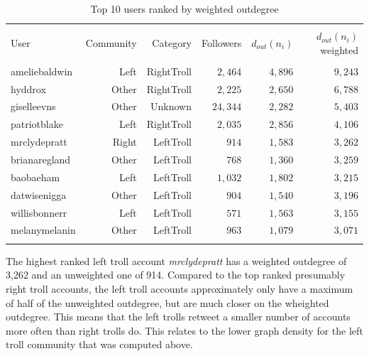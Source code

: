 \documentclass[12pt, titlepage=true, toc=bib]{scrartcl}
\begin{document}
\begin{table}[ht] \centering 
\begin{tabular*}{.95\linewidth}{@{\extracolsep{\fill}} lrrrrr} 
\\[-1.8ex]\hline 
\hline \\[-1.8ex] 
User & Community & Category & Followers & \( d_{out}(n_{i}) \) & \( d_{out}(n_{i}) \) weighted \\ 
\hline \\[-1.8ex] 
ameliebaldwin & Left & RightTroll & $2,464$ & $4,896$ & $9,243$ \\ 
hyddrox & Other & RightTroll & $2,225$ & $2,650$ & $6,788$ \\ 
giselleevns & Other & Unknown & $24,344$ & $2,282$ & $5,403$ \\ 
patriotblake & Left & RightTroll & $2,035$ & $2,856$ & $4,106$ \\ 
mrclydepratt & Right & LeftTroll & $914$ & $1,583$ & $3,262$ \\ 
brianaregland & Other & LeftTroll & $768$ & $1,360$ & $3,259$ \\ 
baobaeham & Left & LeftTroll & $1,032$ & $1,802$ & $3,215$ \\ 
datwisenigga & Other & LeftTroll & $904$ & $1,540$ & $3,196$ \\ 
willisbonnerr & Left & LeftTroll & $571$ & $1,563$ & $3,155$ \\ 
melanymelanin & Other & LeftTroll & $963$ & $1,079$ & $3,071$ \\ 
\hline \\[-1.8ex] 
\end{tabular*} 
  \caption{Top 10 users ranked by weighted outdegree} 
  \label{tab:wout} 
\end{table} 

The highest ranked left troll account \textit{mrclydepratt} has a weighted outdegree of 3,262 and an unweighted one of 914. Compared to the top ranked presumably right troll accounts, the left troll accounts approximately only have a maximum of half of the unweighted outdegree, but are much closer on the wheighted outdegree. This means that the left trolls retweet a smaller number of accounts more often than right trolls do. This relates to the lower graph density for the left troll community that was computed above.
\end{document}
